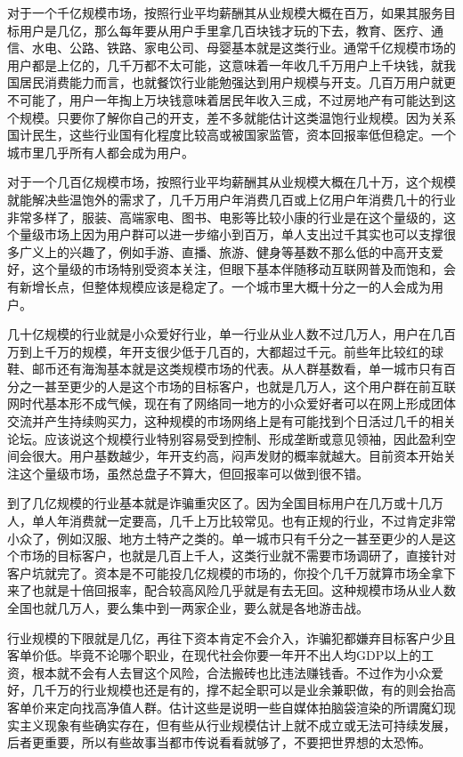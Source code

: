 \documentclass[]{tufte-book}
\begin{document}
对于一个千亿规模市场，按照行业平均薪酬其从业规模大概在百万，如果其服务目标用户是几亿，那么每年要从用户手里拿几百块钱才玩的下去，教育、医疗、通信、水电、公路、铁路、家电公司、母婴基本就是这类行业。通常千亿规模市场的用户都是上亿的，几千万都不太可能，这意味着一年收几千万用户上千块钱，就我国居民消费能力而言，也就餐饮行业能勉强达到用户规模与开支。几百万用户就更不可能了，用户一年掏上万块钱意味着居民年收入三成，不过房地产有可能达到这个规模。只要你了解你自己的开支，差不多就能估计这类温饱行业规模。因为关系国计民生，这些行业国有化程度比较高或被国家监管，资本回报率低但稳定。一个城市里几乎所有人都会成为用户。

对于一个几百亿规模市场，按照行业平均薪酬其从业规模大概在几十万，这个规模就能解决些温饱外的需求了，几千万用户年消费几百或上亿用户年消费几十的行业非常多样了，服装、高端家电、图书、电影等比较小康的行业是在这个量级的，这个量级市场上因为用户群可以进一步缩小到百万，单人支出过千其实也可以支撑很多广义上的兴趣了，例如手游、直播、旅游、健身等基数不那么低的中高开支爱好，这个量级的市场特别受资本关注，但眼下基本伴随移动互联网普及而饱和，会有新增长点，但整体规模应该是稳定了。一个城市里大概十分之一的人会成为用户。

几十亿规模的行业就是小众爱好行业，单一行业从业人数不过几万人，用户在几百万到上千万的规模，年开支很少低于几百的，大都超过千元。前些年比较红的球鞋、邮币还有海淘基本就是这类规模市场的代表。从人群基数看，单一城市只有百分之一甚至更少的人是这个市场的目标客户，也就是几万人，这个用户群在前互联网时代基本形不成气候，现在有了网络同一地方的小众爱好者可以在网上形成团体交流并产生持续购买力，这种规模的市场网络上是有可能找到个日活过几千的相关论坛。应该说这个规模行业特别容易受到控制、形成垄断或意见领袖，因此盈利空间会很大。用户基数越少，年开支约高，闷声发财的概率就越大。目前资本开始关注这个量级市场，虽然总盘子不算大，但回报率可以做到很不错。

到了几亿规模的行业基本就是诈骗重灾区了。因为全国目标用户在几万或十几万人，单人年消费就一定要高，几千上万比较常见。也有正规的行业，不过肯定非常小众了，例如汉服、地方土特产之类的。单一城市只有千分之一甚至更少的人是这个市场的目标客户，也就是几百上千人，这类行业就不需要市场调研了，直接针对客户坑就完了。资本是不可能投几亿规模的市场的，你投个几千万就算市场全拿下来了也就是十倍回报率，配合较高风险几乎就是有去无回。这种规模市场从业人数全国也就几万人，要么集中到一两家企业，要么就是各地游击战。

行业规模的下限就是几亿，再往下资本肯定不会介入，诈骗犯都嫌弃目标客户少且客单价低。毕竟不论哪个职业，在现代社会你要一年开不出人均GDP以上的工资，根本就不会有人去冒这个风险，合法搬砖也比违法赚钱香。不过作为小众爱好，几千万的行业规模也还是有的，撑不起全职可以是业余兼职做，有的则会抬高客单价来定向找高净值人群。估计这些是说明一些自媒体拍脑袋渲染的所谓魔幻现实主义现象有些确实存在，但有些从行业规模估计上就不成立或无法可持续发展，后者更重要，所以有些故事当都市传说看看就够了，不要把世界想的太恐怖。
\end{document}
